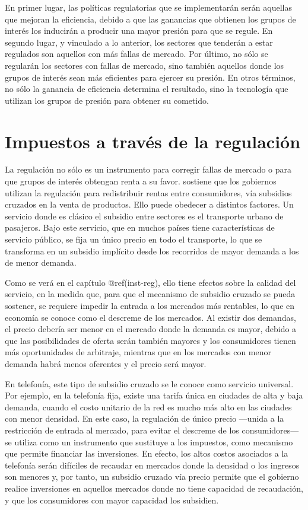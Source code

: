 \documentclass[
  12pt,
  spanish,
]{book}
\begin{document}
En primer lugar, las políticas regulatorias que se implementarán serán
aquellas que mejoran la eficiencia, debido a que las ganancias que
obtienen los grupos de interés los inducirán a producir una mayor
presión para que se regule. En segundo lugar, y vinculado a lo anterior,
los sectores que tenderán a estar regulados son aquellos con más fallas
de mercado. Por último, no sólo se regularán los sectores con fallas de
mercado, sino también aquellos donde los grupos de interés sean más
eficientes para ejercer su presión. En otros términos, no sólo la
ganancia de eficiencia determina el resultado, sino la tecnología que
utilizan los grupos de presión para obtener su cometido.

\hypertarget{impuestos-a-travuxe9s-de-la-regulaciuxf3n}{%
\section{Impuestos a través de la
regulación}\label{impuestos-a-travuxe9s-de-la-regulaciuxf3n}}

La regulación no sólo es un instrumento para corregir fallas de mercado
o para que grupos de interés obtengan renta a su favor.
\citet{Posner1971} sostiene que los gobiernos utilizan la regulación
para redistribuir rentas entre consumidores, vía subsidios cruzados en
la venta de productos. Ello puede obedecer a distintos factores. Un
servicio donde es clásico el subsidio entre sectores es el transporte
urbano de pasajeros. Bajo este servicio, que en muchos países tiene
características de servicio público, se fija un único precio en todo el
transporte, lo que se transforma en un subsidio implícito desde los
recorridos de mayor demanda a los de menor demanda.

Como se verá en el capítulo @ref(inst-reg), ello tiene efectos sobre la
calidad del servicio, en la medida que, para que el mecanismo de
subsidio cruzado se pueda sostener, se requiere impedir la entrada a los
mercados más rentables, lo que en economía se conoce como el descreme de
los mercados. Al existir dos demandas, el precio debería ser menor en el
mercado donde la demanda es mayor, debido a que las posibilidades de
oferta serán también mayores y los consumidores tienen más oportunidades
de arbitraje, mientras que en los mercados con menor demanda habrá menos
oferentes y el precio será mayor.

En telefonía, este tipo de subsidio cruzado se le conoce como servicio
universal. Por ejemplo, en la telefonía fija, existe una tarifa única en
ciudades de alta y baja demanda, cuando el costo unitario de la red es
mucho más alto en las ciudades con menor densidad. En este caso, la
regulación de único precio ---unida a la restricción de entrada al
mercado, para evitar el descreme de los consumidores--- se utiliza como
un instrumento que sustituye a los impuestos, como mecanismo que permite
financiar las inversiones. En efecto, los altos costos asociados a la
telefonía serán difíciles de recaudar en mercados donde la densidad o
los ingresos son menores y, por tanto, un subsidio cruzado vía precio
permite que el gobierno realice inversiones en aquellos mercados donde
no tiene capacidad de recaudación, y que los consumidores con mayor
capacidad los subsidien.
\end{document}
